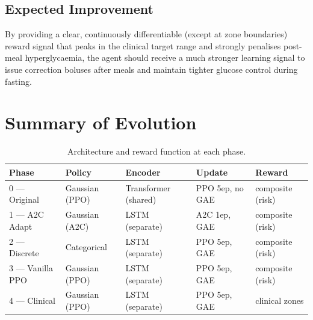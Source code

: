 \documentclass[11pt,a4paper]{article}
\begin{document}
\subsection{Expected Improvement}
By providing a clear, continuously differentiable (except at zone boundaries) reward
signal that peaks in the clinical target range and strongly penalises post-meal
hyperglycaemia, the agent should receive a much stronger learning signal to issue
correction boluses after meals and maintain tighter glucose control during fasting.

\section{Summary of Evolution}

\begin{table}[H]
\centering
\renewcommand{\arraystretch}{1.3}
\begin{tabular}{lllll}
\toprule
\textbf{Phase} & \textbf{Policy} & \textbf{Encoder} & \textbf{Update} & \textbf{Reward} \\
\midrule
0 — Original     & Gaussian (PPO)    & Transformer (shared) & PPO 5ep, no GAE  & composite (risk) \\
1 — A2C Adapt    & Gaussian (A2C)    & LSTM (separate)      & A2C 1ep, GAE     & composite (risk) \\
2 — Discrete     & Categorical       & LSTM (separate)      & PPO 5ep, GAE     & composite (risk) \\
3 — Vanilla PPO  & Gaussian (PPO)    & LSTM (separate)      & PPO 5ep, GAE     & composite (risk) \\
4 — Clinical     & Gaussian (PPO)    & LSTM (separate)      & PPO 5ep, GAE     & clinical zones   \\
\bottomrule
\end{tabular}
\caption{Architecture and reward function at each phase.}
\label{tab:summary}
\end{table}
\end{document}
